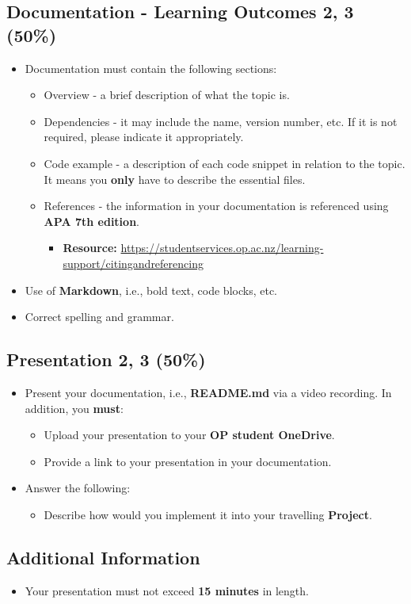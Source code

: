 \documentclass{article}
\begin{document}
\subsection*{Documentation - Learning Outcomes 2, 3 (50\%)}
\begin{itemize}
	\item Documentation must contain the following sections:
	      \begin{itemize}
		      \item Overview - a brief description of what the topic is.
		      \item Dependencies - it may include the name, version number, etc. If it is not required, please indicate it appropriately.
		      \item Code example - a description of each code snippet in relation to the topic. It means you \textbf{only} have to describe the essential files.
		      \item References - the information in your documentation is referenced using \textbf{APA 7th edition}.
		            \begin{itemize}
			            \item \textbf{Resource:} \href{https://studentservices.op.ac.nz/learning-support/citingandreferencing}{https://studentservices.op.ac.nz/learning-support/citingandreferencing}
		            \end{itemize}
	      \end{itemize}
	\item Use of \textbf{Markdown}, i.e., bold text, code blocks, etc.
	\item Correct spelling and grammar.
\end{itemize}

\subsection*{Presentation 2, 3 (50\%)}
\begin{itemize}
	\item Present your documentation, i.e., \textbf{README.md} via a video recording. In addition, you \textbf{must}:
	      \begin{itemize}
		      \item Upload your presentation to your \textbf{OP student OneDrive}.
		      \item Provide a link to your presentation in your documentation.
	      \end{itemize}
	\item Answer the following:
	      \begin{itemize}
		      \item Describe how would you implement it into your travelling \textbf{Project}.
	      \end{itemize}
\end{itemize}

\subsection*{Additional Information}
\begin{itemize}
	\item Your presentation must not exceed \textbf{15 minutes} in length.
\end{itemize}
\end{document}
